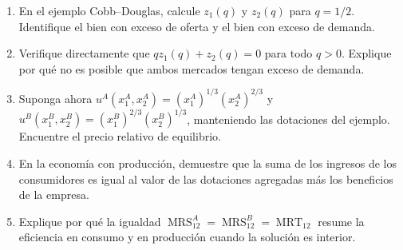 \documentclass[12pt]{article}
\theoremstyle{cideplain}
\theoremstyle{cidedef}
\DeclareMathOperator{\MRS}{MRS}
\DeclareMathOperator{\MRT}{MRT}
\begin{document}
\begin{enumerate}
  \item En el ejemplo Cobb--Douglas, calcule \(z_1(q)\) y \(z_2(q)\) para
  \(q=1/2\). Identifique el bien con exceso de oferta y el bien con exceso de demanda.

  \item Verifique directamente que \(qz_1(q)+z_2(q)=0\) para todo \(q>0\).
  Explique por qué no es posible que ambos mercados tengan exceso de demanda.

  \item Suponga ahora
  \(u^A(x_1^A,x_2^A)=(x_1^A)^{1/3}(x_2^A)^{2/3}\) y
  \(u^B(x_1^B,x_2^B)=(x_1^B)^{2/3}(x_2^B)^{1/3}\), manteniendo las dotaciones del
  ejemplo. Encuentre el precio relativo de equilibrio.

  \item En la economía con producción, demuestre que la suma de los ingresos de los
  consumidores es igual al valor de las dotaciones agregadas más los beneficios de la
  empresa.

  \item Explique por qué la igualdad
  \(\MRS_{12}^A=\MRS_{12}^B=\MRT_{12}\) resume la eficiencia en consumo y en producción
  cuando la solución es interior.
\end{enumerate}

\nocite{JehleReny2011,Williamson2018}


\end{document}
